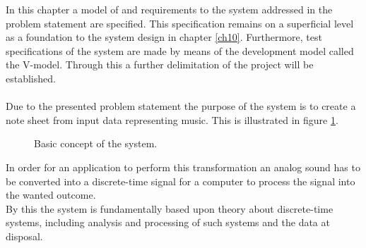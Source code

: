 In this chapter a model of and requirements to the system addressed in the problem statement are specified. This specification remains on a superficial level as a foundation to the system design in chapter \ref{ch10}. Furthermore, test specifications of the system are made by means of the development model called the V-model. Through this a further delimitation of the project will be established. \\   
\\
Due to the presented problem statement the purpose of the system is to create a note sheet from input data representing music. This is illustrated in figure \ref{fig:model1}.    
\begin{figure}[H]
\centering
{}
\caption{Basic concept of the system.}
\label{fig:model1}
\end{figure}
In order for an application to perform this transformation an analog sound has to be converted into a discrete-time signal for a computer to process the signal into the wanted outcome. \\
By this the system is fundamentally based upon theory about discrete-time systems, including analysis and processing of such systems and the data at disposal.

